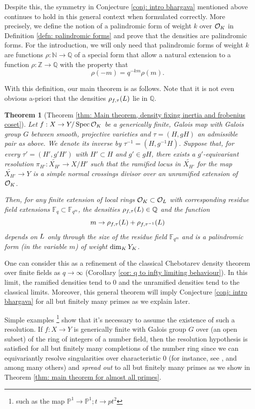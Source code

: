 \documentclass[10pt]{article}
\theoremstyle{plain}
\newtheorem{thm}[theorem]{Theorem}
\theoremstyle{definition}
\numberwithin{equation}{section}
\begin{document}
Despite this, the symmetry in Conjecture \ref{conj: intro bhargava} mentioned above continues to hold in this general context when formulated correctly. More precisely, we define the notion of a palindromic form of weight $k$ over ${{\mathcal O}_{K}}$ in Definition \ref{defn: palindromic forms} and prove that the densities are palindromic forms. For the introduction, we will only need that palindromic forms of weight $k$ are functions $\rho: \mathbb N \to \mathbb Q$ of a special form that allow a natural extension to a function $\rho: \mathbb Z \to \mathbb Q$ with the property that
\[\rho(-m) = q^{-km}\rho(m).\]

With this definition, our main theorem is as follows. Note that it is not even obvious a-priori that the densities $\rho_{f,\tau}({L})$ lie in $\mathbb Q$.

\begin{thm}[Theorem \ref{thm: Main theorem, density fixing inertia and frobenius coset}]
Let $f: X \to Y/\operatorname{Spec}{{\mathcal O}_{K}}$ be a generically finite, Galois map with Galois group $G$ between smooth, projective varieties and $\tau = (H,gH)$ an admissible pair as above. We denote its inverse by $\tau^{-1} = (H,g^{-1}H)$. Suppose that, for every $\tau' = (H',g'H')$ with $H' \subset H$ and $g' \in gH$, there exists a $g'$-equivariant resolution $\pi_{H'}: \widetilde{X_{H'}} \to X/H'$ such that the ramified locus in $\widetilde{X_{H'}}$ for the map $\widetilde{X_{H'}} \to Y$ is a simple normal crossings divisor over an unramified extension of ${{\mathcal O}_{K}}$. 

Then, for any finite extension of local rings ${{\mathcal O}_{K}} \subset { {\mathcal O} _{L}}$ with corresponding residue field extensions $\mathbb F_q \subset \mathbb F_{q^m}$, the densities $\rho_{f,\tau}({L}) \in \mathbb Q$ and the function
\[ m \to \rho_{f,\tau}({L}) + \rho_{f,\tau^{-1}}({L})\]
depends on ${L}$ only through the size of the residue field $\mathbb F_{q^m}$ and is a palindromic form (in the variable $m$) of weight $\dim_{K} Y_{K}$.
\end{thm}

One can consider this as a refinement of the classical Chebotarev density theorem over finite fields as $q \to \infty$ (Corollary \ref{cor: q to infty limiting behaviour}). In this limit, the ramified densities tend to $0$ and the unramified densities tend to the classical limits. Moreover, this general theorem will imply Conjecture \ref{conj: intro bhargava} for all but finitely many primes as we explain later.

Simple examples \footnote{such as the map $\mathbb P^1 \to \mathbb P^1; t \to pt^2$} show that it's necessary to assume the existence of such a resolution. If $f: X \to Y$ is generically finite with Galois group $G$ over (an open subset) of the ring of integers of a number field, then the resolution hypothesis is satisfied for all but finitely many completions of the number ring since we can equivariantly resolve singularities over characteristic $0$ (for instance, see \cite{abramovich1996equivariant},\cite{encinas1998good} and \cite{bierstone1997canonical} among many others) and \emph{spread out} to all but finitely many primes as we show in Theorem \ref{thm: main theorem for almost all primes}.
\end{document}
